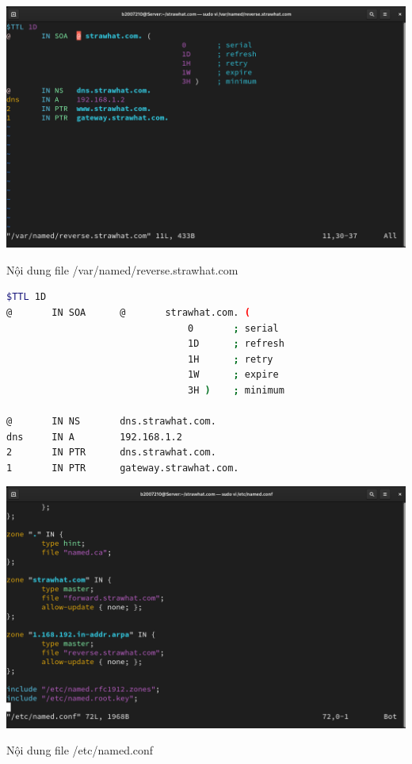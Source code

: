 \documentclass[a4paper, 11pt]{article}
\begin{document}
\begin{minipage}
    {\linewidth}
    \captionsetup{type=figure}
    \centering
    \includegraphics[width=\linewidth]{images/reverse-strawhat-com.png}
    \caption{Nội dung file /var/named/reverse.strawhat.com}
    \label{figure:reverse-strawhat-com}
\end{minipage}

\begin{lstlisting}[language=bash, caption={Nội dung file /var/named/reverse.strawhat.com}]
$TTL 1D
@       IN SOA      @       strawhat.com. (
                                0       ; serial
                                1D      ; refresh
                                1H      ; retry
                                1W      ; expire
                                3H )    ; minimum

@       IN NS       dns.strawhat.com.
dns     IN A        192.168.1.2
2       IN PTR      dns.strawhat.com.
1       IN PTR      gateway.strawhat.com.
\end{lstlisting}

\begin{minipage}
    {\linewidth}
    \captionsetup{type=figure}
    \centering
    \includegraphics[width=\linewidth]{images/named-conf.png}
    \caption{Nội dung file /etc/named.conf}
    \label{figure:named-conf}
\end{minipage}
\end{document}
